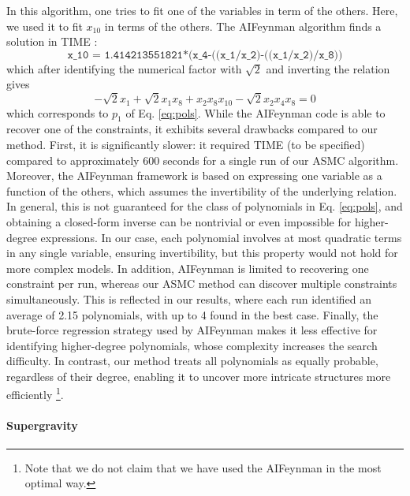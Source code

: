 \documentclass[11pt]{article}
\begin{document}
In this algorithm, one tries to fit one of the variables in term of the others. Here, we used it to fit $x_{10}$ in terms of the others. The AIFeynman algorithm finds a solution in TIME : 
\begin{equation}
	\texttt{x\_10 = 1.414213551821*(x\_4-((x\_1/x\_2)-((x\_1/x\_2)/x\_8))}
\end{equation}
which after identifying the numerical factor with $\sqrt 2$ and inverting the relation gives 
\begin{equation}
	- \sqrt 2 x_1 + \sqrt 2 x_1 x_8 + x_2 x_8  x_{10} -\sqrt 2 x_2 x_4 x_8 = 0
\end{equation}
which corresponds to $p_1$ of Eq. \eqref{eq:pols}. While the AIFeynman code is able to recover one of the constraints, it exhibits several drawbacks compared to our method. First, it is significantly slower: it required TIME (to be specified) compared to approximately 600 seconds for a single run of our ASMC algorithm. Moreover, the AIFeynman framework is based on expressing one variable as a function of the others, which assumes the invertibility of the underlying relation. In general, this is not guaranteed for the class of polynomials in Eq. \eqref{eq:pols}, and obtaining a closed-form inverse can be nontrivial or even impossible for higher-degree expressions. In our case, each polynomial involves at most quadratic terms in any single variable, ensuring invertibility, but this property would not hold for more complex models. In addition, AIFeynman is limited to recovering one constraint per run, whereas our ASMC method can discover multiple constraints simultaneously. This is reflected in our results, where each run identified an average of 2.15 polynomials, with up to 4 found in the best case. Finally, the brute-force regression strategy used by AIFeynman makes it less effective for identifying higher-degree polynomials, whose complexity increases the search difficulty. In contrast, our method treats all polynomials as equally probable, regardless of their degree, enabling it to uncover more intricate structures more efficiently \footnote{Note that we do not claim that we have used the AIFeynman in the most optimal way.}.


\paragraph{Supergravity}
\end{document}
